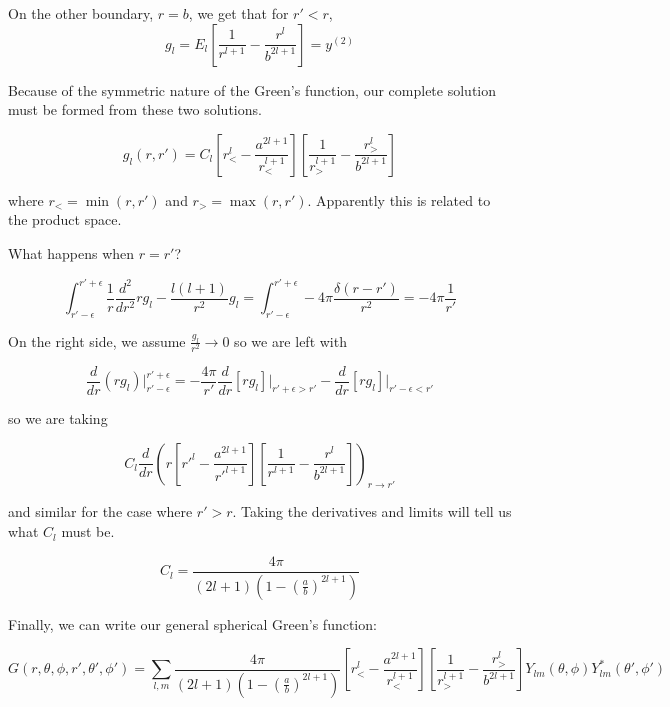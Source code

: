 \documentclass[a4paper,twoside,master.tex]{subfiles}
\begin{document}
On the other boundary, $r=b$, we get that for $r'<r$,
\begin{equation}
    g_l = E_l\left[\frac{1}{r^{l+1}}-\frac{r^l}{b^{2l+1}}\right] = y^{(2)}
\end{equation}

Because of the symmetric nature of the Green's function, our complete solution must be formed from these two solutions.

\begin{equation}
    g_l(r,r') = C_l\left[r^l_< - \frac{a^{2l+1}}{r^{l+1}_<}\right]\left[\frac{1}{r^{l+1}_>}-\frac{r^l_>}{b^{2l+1}}\right]
\end{equation}

where $r_<=\min(r,r')$ and $r_> = \max(r,r')$. Apparently this is related to the product space.

What happens when $r=r'$?

\begin{equation}
    \int_{r'-\epsilon}^{r'+\epsilon}\frac{1}{r}\frac{d^2}{dr^2}rg_l-\frac{l(l+1)}{r^2}g_l = \int_{r'-\epsilon}^{r'+\epsilon}-4\pi\frac{\delta(r-r')}{r^2} = -4\pi\frac{1}{r'}
\end{equation}

On the right side, we assume $\frac{g_l}{r^2}\to 0$ so we are left with

\begin{equation}
    \frac{d}{dr}(rg_l)\bigg|_{r'-\epsilon}^{r'+\epsilon} = -\frac{4\pi}{r'} \frac{d}{dr}[rg_l]\bigg|_{r'+\epsilon>r'}-\frac{d}{dr}[rg_l]\bigg|_{r'-\epsilon<r'}
\end{equation}

so we are taking

\begin{equation}
    C_l\frac{d}{dr}\left(r\left[r'^l-\frac{a^{2l+1}}{r'^{l+1}}\right]\left[\frac{1}{r^{l+1}}-\frac{r^l}{b^{2l+1}}\right]\right)_{r\to r'}
\end{equation}

and similar for the case where $r'>r$. Taking the derivatives and limits will tell us what $C_l$ must be.

\begin{equation}
    C_l = \frac{4\pi}{(2l+1)\left(1-\left(\frac{a}{b}\right)^{2l+1}\right)}
\end{equation}

Finally, we can write our general spherical Green's function:

\begin{equation}
    G(r,\theta,\phi,r',\theta',\phi') = \sum_{l,m}\frac{4\pi}{(2l+1)\left(1-\left(\frac{a}{b}\right)^{2l+1}\right)}\left[r^l_< - \frac{a^{2l+1}}{r^{l+1}_<}\right]\left[\frac{1}{r^{l+1}_>}-\frac{r^l_>}{b^{2l+1}}\right]Y_{lm}(\theta,\phi)Y_{lm}^*(\theta',\phi')
\end{equation}
\end{document}
